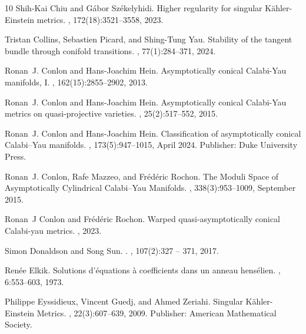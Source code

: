 \documentclass[a4paper,11pt]{article}
\begin{document}
\begin{thebibliography}{10}
Shih-Kai Chiu and G\'abor Sz\'ekelyhidi.
\newblock Higher regularity for singular {K}\"ahler-{E}instein metrics.
, 172(18):3521--3558, 2023.

Tristan Collins, Sebastien Picard, and Shing-Tung Yau.
\newblock Stability of the tangent bundle through conifold transitions.
, 77(1):284--371, 2024.

Ronan~J. Conlon and Hans-Joachim Hein.
\newblock Asymptotically conical {C}alabi-{Y}au manifolds, {I}.
, 162(15):2855--2902, 2013.

Ronan~J. Conlon and Hans-Joachim Hein.
\newblock Asymptotically conical {C}alabi-{Y}au metrics on quasi-projective varieties.
, 25(2):517--552, 2015.

Ronan~J. Conlon and Hans-Joachim Hein.
\newblock Classification of asymptotically conical {Calabi}–{Yau} manifolds.
, 173(5):947--1015, April 2024.
\newblock Publisher: Duke University Press.

Ronan~J. Conlon, Rafe Mazzeo, and Frédéric Rochon.
\newblock The {Moduli} {Space} of {Asymptotically} {Cylindrical} {Calabi}–{Yau} {Manifolds}.
, 338(3):953--1009, September 2015.

Ronan~J Conlon and Fr{\'e}d{\'e}ric Rochon.
\newblock Warped quasi-asymptotically conical {C}alabi-yau metrics.
, 2023.

Simon Donaldson and Song Sun.
.
, 107(2):327 -- 371, 2017.

Ren\'ee Elkik.
\newblock Solutions d'\'equations \`a{} coefficients dans un anneau hens\'elien.
, 6:553--603, 1973.

Philippe Eyssidieux, Vincent Guedj, and Ahmed Zeriahi.
\newblock Singular {Kähler}-{Einstein} {Metrics}.
, 22(3):607--639, 2009.
\newblock Publisher: American Mathematical Society.


\end{thebibliography}
\end{document}
